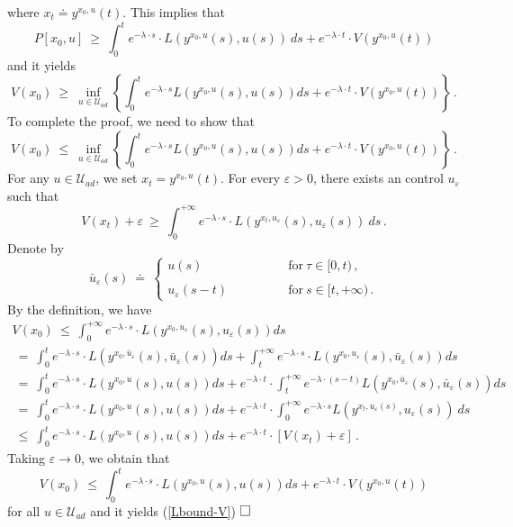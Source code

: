 \documentclass[letterpaper,12pt]{article}
\numberwithin{equation}{section}
\newcommand{\qed}{\hfill$\square$\vspace{0.3truecm}}
\def\ve{\varepsilon}
\def\bel{\begin{equation}\label}
\def\eeq{\end{equation}}
\def\sqr#1#2{\vbox{\hrule height .#2pt
\hbox{\vrule width .#2pt height #1pt \kern #1pt
\vrule width .#2pt}\hrule height .#2pt }}
\def\square{\sqr74}
\begin{document}
where $x_t\doteq y^{x_0,u}(t)$. This implies that 
\[
P[x_0,u]~\geq~\int_{0}^te^{-\lambda\cdot s}\cdot L(y^{x_0,u}(s),u(s))~ds+e^{-\lambda\cdot t}\cdot V(y^{x_0,u}(t))
\]
and it yields
\[
V(x_0)~\geq~\inf_{u\in\mathcal{U}_{ad}}\left\{\int_{0}^te^{-\lambda\cdot s}L(y^{x_0,u}(s),u(s))ds+e^{-\lambda\cdot t}\cdot V(y^{x_0,u}(t))\right\}\,.
\]
To complete the proof, we need to show that 
\bel{Lbound-V}
V(x_0)~\leq~\inf_{u\in\mathcal{U}_{ad}}\left\{\int_{0}^te^{-\lambda\cdot s}L(y^{x_0,u}(s),u(s))ds+e^{-\lambda\cdot t}\cdot V(y^{x_0,u}(t))\right\}\,.
\eeq
For any $u\in\mathcal{U}_{ad}$, we set $x_t=y^{x_0,u}(t)$. For every $\ve>0$, there exists an control $u_{\ve}$ such that 
\[
V(x_t)+\ve~\geq~\int_{0}^{+\infty}e^{-\lambda\cdot s }\cdot L(y^{x_t,u_{\ve}}(s),u_{\ve}(s))~ds\,.
\]
Denote by 
\[
\bar{u}_{\ve}(s)~\doteq~ \left\{\begin{array}{ll}
u(s)\qquad&\qquad\mathrm{for}~\tau\in [0,t)\,,\\
\\
u_{\ve}(s-t)\qquad&\qquad\mathrm{for}~s\in [t,+\infty)\,.
\end{array}\right.
\]
By the definition, we have 
\begin{multline*}
V(x_0)~\leq~\int_{0}^{+\infty}e^{-\lambda\cdot s}\cdot L(y^{x_0,u_{\ve}}(s),u_{\ve}(s))ds
\\
~=~\int_{0}^{t}e^{-\lambda\cdot s}\cdot L(y^{x_0,\bar{u}_{\ve}}(s),\bar{u}_{\ve}(s))ds+\int_{t}^{+\infty}e^{-\lambda\cdot s}\cdot L(y^{x_0,u_{\ve}}(s),\bar{u}_{\ve}(s))ds\\
~=~\int_{0}^{t}e^{-\lambda\cdot s}\cdot L(y^{x_0,u}(s),u(s))ds+e^{-\lambda\cdot t}\cdot \int_{t}^{+\infty}e^{-\lambda\cdot (s-t)}L(y^{x_0,\bar{u}_{\ve}}(s),\bar{u}_{\ve}(s))ds\\
~=~\int_{0}^{t}e^{-\lambda\cdot s}\cdot L(y^{x_0,u}(s),u(s))ds+e^{-\lambda\cdot t}\cdot\int_{0}^{+\infty}e^{-\lambda\cdot s} L(y^{x_t,u_{\ve}(s)},u_{\ve}(s))~ds\\
~\leq~\int_{0}^{t}e^{-\lambda\cdot s}\cdot L(y^{x_0,u}(s),u(s))ds+e^{-\lambda\cdot t}\cdot[V(x_t)+\ve]\,.
\end{multline*}
Taking $\ve\to 0$, we obtain that 
\[
V(x_0)~\leq~\int_{0}^{t}e^{-\lambda\cdot s}\cdot L(y^{x_0,u}(s),u(s))ds+e^{-\lambda\cdot t}\cdot V(y^{x_0,u}(t))
\]
for all $u\in\mathcal{U}_{ad}$ and it yields (\ref{Lbound-V})
\qed
\end{document}
